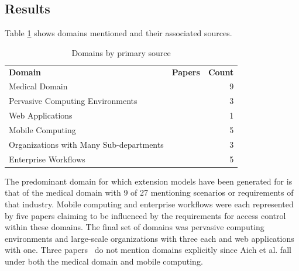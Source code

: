 \subsection{Results}

Table \ref{tab:domains} shows domains mentioned and their associated sources.

\begin{table}
\centering
\caption{Domains by primary source}
\vspace{0.1 in}
\begin{tabular*}{.9\linewidth}{| p{.45\linewidth} | p{.3\linewidth} | r | }
\cline{1-3}

\textbf{Domain} & \textbf{Papers} & \textbf{Count} \\ \cline{1-3}
Medical Domain
&
\cite{alam06:constraint}
\cite{tzelepi01:flexible}
\cite{motta03:contextual}
\cite{ni2010privacy}
\cite{damiani2007geo}
\cite{hansen2003spatial}
\cite{samuel07:spatio-temporal}
\cite{aich09:role}
\cite{zhou2007team}
&
9 \\ \cline{1-3}
Pervasive Computing Environments
& 
\cite{huang06:pervasive}
\cite{chen08:spatio-temporal}
\cite{ray07:spatio}
&
3 \\ \cline{1-3}
Web Applications
& 
\cite{masoumzadeh2008purbac}
&
1 \\ \cline{1-3}
Mobile Computing
& 
\cite{thein2011leveraging}
\cite{zou2009crbac}
\cite{chandran05:llt}
\cite{ray07:spatio}
\cite{aich09:role}
&
5 \\ \cline{1-3}
Organizations with Many Sub-departments
& 
\cite{yamazaki04:designing}
\cite{jian2008extended}
\cite{yao2008task}
&
3 \\ \cline{1-3}
Enterprise Workflows
&
\cite{cholewka00:acontext-sensitive}
\cite{bao08:role}
\cite{zhang06:collaborative}
\cite{oh2003task}
\cite{joshi05:generalized}
&
5 \\ \cline{1-3}

\end{tabular*}
\label{tab:domains}
\end{table}

The predominant domain for which extension models have been generated for is that of the medical domain with 9 of 27 mentioning scenarios or requirements of that industry.
Mobile computing and enterprise workflows were each represented by five papers claiming to be influenced by the requirements for access control within these domains. The final set
of domains was pervasive computing environments and large-scale organizations with three each and web applications with one.  Three papers~\cite{jian2008extended, aich07:STARBAC, haibo05:context} do not mention domains explicitly since Aich et al. \cite{aich09:role} fall under both the medical domain and mobile computing.

